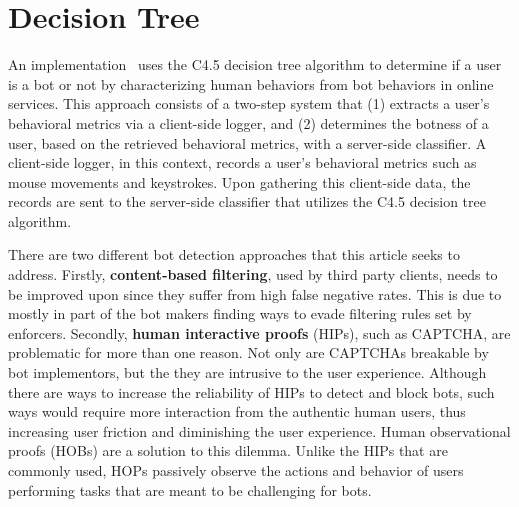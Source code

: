 
\section{Decision Tree}\label{sec:decision-tree}

An implementation~\cite{bot_or_human} uses the C4.5 decision tree algorithm to determine if a user is a bot or not by characterizing human behaviors from bot behaviors in online services.
This approach consists of a two-step system that (1) extracts a user's behavioral metrics via a client-side logger, and (2) determines the botness of a user, based on the retrieved behavioral metrics, with a server-side classifier.
A client-side logger, in this context, records a user's behavioral metrics such as mouse movements and keystrokes.
Upon gathering this client-side data, the records are sent to the server-side classifier that utilizes the C4.5 decision tree algorithm.

There are two different bot detection approaches that this article seeks to address.
Firstly, \textbf{content-based filtering}, used by third party clients, needs to be improved upon since they suffer from high false negative rates.
This is due to mostly in part of the bot makers finding ways to evade filtering rules set by enforcers.
Secondly, \textbf{human interactive proofs} (HIPs), such as CAPTCHA, are problematic for more than one reason.
Not only are CAPTCHAs breakable by bot implementors, but the they are intrusive to the user experience.
Although there are ways to increase the reliability of HIPs to detect and block bots, such ways would require more interaction from the authentic human users, thus increasing user friction and diminishing the user experience.
Human observational proofs (HOBs) are a solution to this dilemma.
Unlike the HIPs that are commonly used, HOPs passively observe the actions and behavior of users performing tasks that are meant to be challenging for bots.

